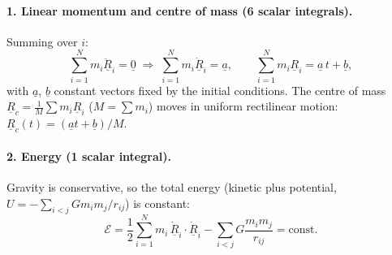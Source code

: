 \paragraph{1. Linear momentum and centre of mass (6 scalar integrals).} Summing over $i$:
\begin{equation}
\sum_{i=1}^{N}m_i\ddot{\underline R}_i=\underline 0\;\Longrightarrow\;
\sum_{i=1}^{N}m_i\dot{\underline R}_i=\underline a,\qquad \sum_{i=1}^{N}m_i\underline R_i=\underline a\,t+\underline b,
\end{equation}
with $\underline a$, $\underline b$ constant vectors fixed by the initial conditions. The centre of mass
$\underline R_c=\frac{1}{M}\sum m_i\underline R_i$ ($M=\sum m_i$) moves in uniform rectilinear motion: $\underline R_c(t)=(\underline at+\underline b)/M$.

\paragraph{2. Energy (1 scalar integral).} Gravity is conservative, so the total energy (kinetic plus potential,
$U=-\sum_{i<j}Gm_im_j/r_{ij}$) is constant:
\begin{equation}
\mathcal E=\frac12\sum_{i=1}^{N}m_i\,\dot{\underline R}_i\cdot\dot{\underline R}_i-\sum_{i<j}G\frac{m_im_j}{r_{ij}}=\text{const}.
\end{equation}

